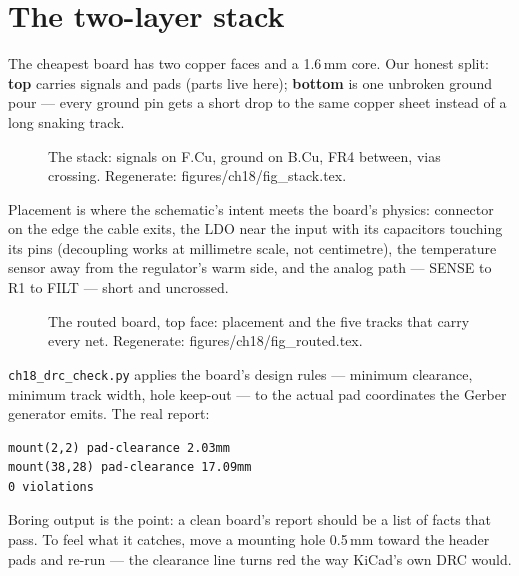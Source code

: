 \section{The two-layer stack}\label{sec:stack18}

The cheapest board has two copper faces and a 1.6\,mm core. Our
honest split: \textbf{top} carries signals and pads (parts live
here); \textbf{bottom} is one unbroken ground pour --- every ground
pin gets a short drop to the same copper sheet instead of a long
snaking track.

\begin{figure}[htbp]
\centering

\caption{The stack: signals on F.Cu, ground on B.Cu, FR4 between,
vias crossing. Regenerate: \ttfamily figures/ch18/fig\_stack.tex.}
\label{fig:stack18}
\end{figure}

Placement is where the schematic's intent meets the board's physics:
connector on the edge the cable exits, the LDO near the input with
its capacitors touching its pins (decoupling works at millimetre
scale, not centimetre), the temperature sensor away from the
regulator's warm side, and the analog path --- SENSE to R1 to FILT
--- short and uncrossed.

\begin{figure}[htbp]
\centering

\caption{The routed board, top face: placement and the five tracks
that carry every net. Regenerate: \ttfamily
figures/ch18/fig\_routed.tex.}
\label{fig:routed18}
\end{figure}

\begin{example}
\texttt{ch18\_drc\_check.py} applies the board's design rules ---
minimum clearance, minimum track width, hole keep-out --- to the
actual pad coordinates the Gerber generator emits. The real report:

\begin{lstlisting}[caption={\ttfamily ch18\_drc\_check.py output over
the real layout.}]
mount(2,2) pad-clearance 2.03mm
mount(38,28) pad-clearance 17.09mm
0 violations
\end{lstlisting}

Boring output is the point: a clean board's report should be a list
of facts that pass. To feel what it catches, move a mounting hole
0.5\,mm toward the header pads and re-run --- the clearance line
turns red the way KiCad's own DRC would.
\end{example}

